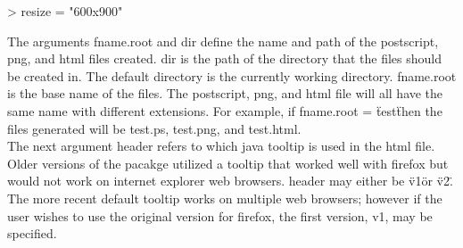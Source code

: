 \documentclass[]{article}
\begin{document}
\begin{Schunk}
\begin{Sinput}
> resize = "600x900"
\end{Sinput}
\end{Schunk}
\quad The arguments fname.root and dir define the name and path of the postscript, png, and html files created. dir is the path of the directory that the files should be created in. The default directory is the currently working directory. fname.root is the base name of the files. The postscript, png, and html file will all have the same name with different extensions. For example, if fname.root =  \"test\"   then the files generated will be test.ps, test.png, and test.html. \\
\quad The next argument header refers to which java tooltip is used in the html file. Older versions of the pacakge utilized a tooltip that worked well with firefox but would not work on internet explorer web browsers. header may either be \"v1\" or \"v2\". The more recent default tooltip works on multiple web browsers; however if the user wishes to use the original version for firefox, the first version, v1,  may be specified.\\
\end{document}
